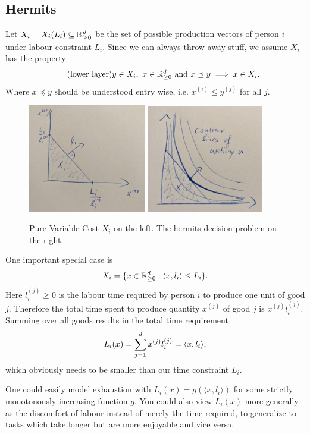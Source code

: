 \subsection{Hermits}

Let \(X_i = X_i(L_i)\subseteq \mathbb{R}_{\ge 0}^d\) be the set of possible production vectors of person \(i\)
under labour constraint \(L_i\). Since we can always throw away stuff, we
assume \(X_i\) has the property
\[
	\label{eq: lower layer}
	\tag{lower layer}
	y\in X_i,\ x\in\mathbb{R}_{\ge 0}^d \text{ and } x\preceq y \implies x\in X_i.
\]
Where \(x \preceq y\) should be understood entry wise, i.e. \(x^{(i)} \le
y^{(j)}\) for all \(j\).

\begin{figure}
	\centering
	\includegraphics[width=0.46\textwidth]{images/pure-variable-cost.jpeg}
	\includegraphics[width=0.45\textwidth]{images/hermit-decision-pure-variable.jpeg}
	\caption{
		Pure Variable Cost \(X_i\) on the left. The hermits decision problem
		on the right.
	}
\end{figure}
\begin{example*}
	One important special case is
	\[
		X_i = \{ x \in \mathbb{R}_{\ge 0}^d: \langle x, l_i \rangle \le L_i \}.
	\]
	Here \(l_i^{(j)}\ge0\) is the labour time required by person \(i\) to produce one
	unit of good \(j\). Therefore the total time spent to produce quantity
	\(x^{(j)}\) of good \(j\) is \(x^{(j)}l_i^{(j)}\). Summing over all goods
	results in the total time requirement
	\[
		L_i(x) = \sum_{j=1}^d x^{(j)}l_i^{(j)} = \langle x, l_i\rangle,
	\]
	which obviously needs to be smaller than our time constraint \(L_i\).

	One could easily model exhaustion with \(L_i(x) = g(\langle x, l_i\rangle)\)
	for some strictly monotonously increasing function \(g\). You could also
	view \(L_i(x)\) more generally as the discomfort of labour instead of merely
	the time required, to generalize to tasks which take longer but are more
	enjoyable and vice versa.
\end{example*}

